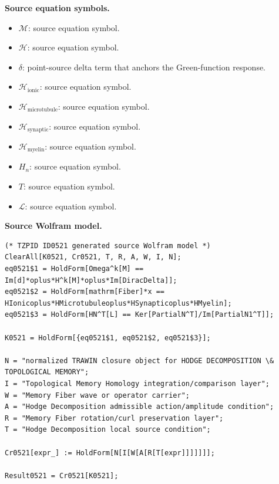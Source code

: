 \begin{minipage}[t]{0.49\linewidth}
\begingroup
\small
\raggedright
\textbf{Source equation symbols.}\par
\begin{itemize}[leftmargin=1.35em,itemsep=1pt,topsep=1pt,parsep=0pt]
    \item $\mathcal{M}$: source equation symbol.
    \item $\mathcal{H}$: source equation symbol.
    \item $\delta$: point-source delta term that anchors the Green-function response.
    \item $\mathcal{H}_{\mathrm{ionic}}$: source equation symbol.
    \item $\mathcal{H}_{\mathrm{microtubule}}$: source equation symbol.
    \item $\mathcal{H}_{\mathrm{synaptic}}$: source equation symbol.
    \item $\mathcal{H}_{\mathrm{myelin}}$: source equation symbol.
    \item $H_n$: source equation symbol.
    \item $T$: source equation symbol.
    \item $\mathcal{L}$: source equation symbol.
\end{itemize}
\endgroup
\end{minipage}\hfill
\begin{minipage}[t]{0.47\linewidth}
\begingroup
\scriptsize
\raggedright
\textbf{Source Wolfram model.}\par
\begin{Verbatim}[fontsize=\tiny,breaklines=true,breakanywhere=true]
(* TZPID ID0521 generated source Wolfram model *)
ClearAll[K0521, Cr0521, T, R, A, W, I, N];
eq0521$1 = HoldForm[Omega^k[M] == Im[d]*oplus*H^k[M]*oplus*Im[DiracDelta]];
eq0521$2 = HoldForm[mathrm[Fiber]*x == HIonicoplus*HMicrotubuleoplus*HSynapticoplus*HMyelin];
eq0521$3 = HoldForm[HN^T[L] == Ker[PartialN^T]/Im[PartialN1^T]];

K0521 = HoldForm[{eq0521$1, eq0521$2, eq0521$3}];

N = "normalized TRAWIN closure object for HODGE DECOMPOSITION \& TOPOLOGICAL MEMORY";
I = "Topological Memory Homology integration/comparison layer";
W = "Memory Fiber wave or operator carrier";
A = "Hodge Decomposition admissible action/amplitude condition";
R = "Memory Fiber rotation/curl preservation layer";
T = "Hodge Decomposition local source condition";

Cr0521[expr_] := HoldForm[N[I[W[A[R[T[expr]]]]]]];

Result0521 = Cr0521[K0521];
\end{Verbatim}
\endgroup
\end{minipage}

